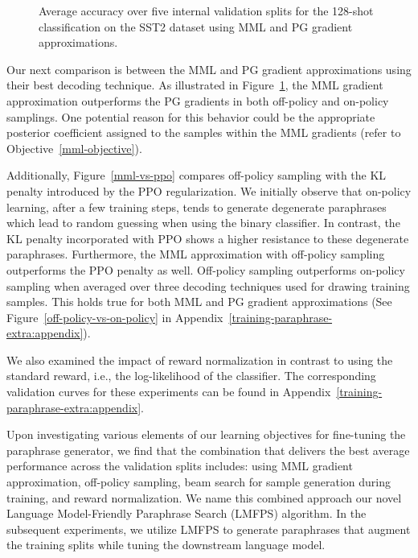 \documentclass[11pt]{article}
\begin{document}
\begin{figure}[h]
\begin{center}

\end{center}
\caption{Average accuracy over five internal validation splits for the 128-shot classification on the SST2 dataset using MML and PG gradient approximations.}
\label{mml-vs-pg}
\end{figure}

Our next comparison is between the MML and PG gradient approximations using their best decoding technique. As illustrated in Figure~\ref{mml-vs-pg}, the MML gradient approximation outperforms the PG gradients in both off-policy and on-policy samplings. One potential reason for this behavior could be the appropriate posterior coefficient assigned to the samples within the MML gradients (refer to Objective~\ref{mml-objective}). 


Additionally, Figure~\ref{mml-vs-ppo} compares off-policy sampling with the KL penalty introduced by the PPO regularization. We initially observe that on-policy learning, after a few training steps, tends to generate degenerate paraphrases which lead to random guessing when using the binary classifier. In contrast, the KL penalty incorporated with PPO shows a higher resistance to these degenerate paraphrases. Furthermore, the MML approximation with off-policy sampling outperforms the PPO penalty as well. Off-policy sampling outperforms on-policy sampling when averaged over three decoding techniques used for drawing training samples. This holds true for both MML and PG gradient approximations (See Figure~\ref{off-policy-vs-on-policy} in Appendix~\ref{training-paraphrase-extra:appendix}).

We also examined the impact of reward normalization in contrast to using the standard reward, i.e., the log-likelihood of the classifier. The corresponding validation curves for these experiments can be found in Appendix~\ref{training-paraphrase-extra:appendix}.

Upon investigating various elements of our learning objectives for fine-tuning the paraphrase generator, we find that the combination that delivers the best average performance across the validation splits includes: using MML gradient approximation, off-policy sampling, beam search for sample generation during training, and reward normalization. We name this combined approach our novel Language Model-Friendly Paraphrase Search (LMFPS) algorithm. In the subsequent experiments, we utilize LMFPS to generate paraphrases that augment the training splits while tuning the downstream language model.
\end{document}
